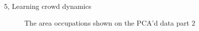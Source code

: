 \begin{task}{5, Learning crowd dynamics}
\begin{figure}[H]
\centering
{}
\caption{The area occupations shown on the PCA'd data part 2}
\label{fig:PCAoccs2}
\end{figure}


\end{task}
